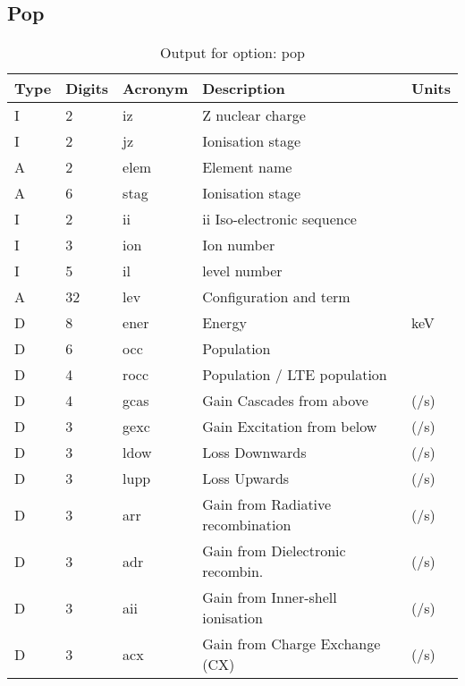 \subsection{Pop}

\begin{table}[!p]
\caption{Output for option: pop}
\label{tabout:pop}
\begin{tabular}{lllll}
\hline
Type & Digits & Acronym & Description & Units \\ 
\hline
I &  2 & iz   & Z nuclear charge                 &                  \\
I &  2 & jz   & Ionisation stage                 &                  \\
A &  2 & elem & Element name                     &                  \\
A &  6 & stag & Ionisation stage                 &                  \\
I &  2 & ii   & ii Iso-electronic sequence       &                  \\
I &  3 & ion  & Ion number                       &                  \\
I &  5 & il   & level number                     &                  \\
A & 32 & lev  & Configuration and term           &                  \\
D &  8 & ener & Energy                           & keV              \\
D &  6 & occ  & Population                       &                  \\
D &  4 & rocc & Population / LTE population      &                  \\
D &  4 & gcas & Gain Cascades from above         & (/s)             \\
D &  3 & gexc & Gain Excitation from below       & (/s)             \\
D &  3 & ldow & Loss Downwards                   & (/s)             \\
D &  3 & lupp & Loss Upwards                     & (/s)             \\
D &  3 & arr  & Gain from Radiative recombination& (/s)             \\
D &  3 & adr  & Gain from Dielectronic recombin. & (/s)             \\
D &  3 & aii  & Gain from Inner-shell ionisation & (/s)             \\
D &  3 & acx  & Gain from Charge Exchange (CX)   & (/s)             \\
\hline
\end{tabular}
\end{table}

